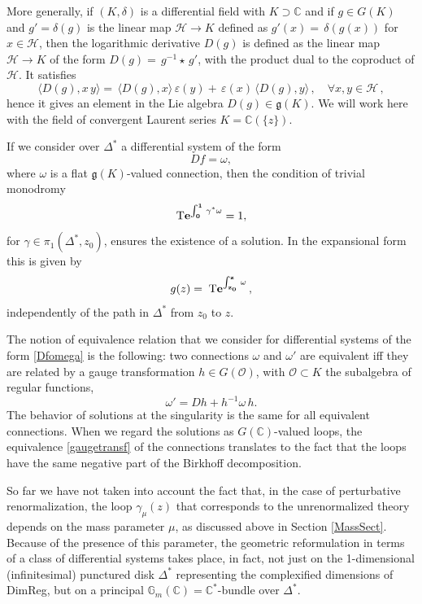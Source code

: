 \documentclass[10pt]{amsart}
\def\C{{\mathbb C}}
\newcommand{\bG}{\mathbb{G}}
\def\cH{{\mathcal H}}
\def\Hc{{\mathcal H}}
\renewcommand{\O}{{\mathcal O}}
\newcommand{\fg}{{\mathfrak{g}}}
\def\g{\gamma}
\def\ve{\varepsilon}
\def\qq{{\,,\quad \forall}}
\numberwithin{equation}{section}
\begin{document}
\smallskip

More generally, if $(K,\delta)$ is a differential field with $K\supset
\C$ and if $g\in
G(K)$ and $g'=\delta(g)$ is the linear map $\Hc\to K$ defined as
$g'(x)=\, \delta(g(x))$ for $x\in \Hc$, then the
logarithmic derivative $D(g)$ is defined as the linear map $\Hc\to K$
of the form $D(g)=\,g^{-1}\star\, g'$, with the product dual to the
coproduct of $\cH$. It satisfies
$$
\langle D(g),x\,y\rangle=\,\langle D(g),x\rangle\,\ve(y)
+\,\ve(x)\,\langle D(g),y\rangle \qq x,y \in \Hc\,,
$$
hence it gives an element in the Lie algebra $D(g) \in \fg(K)$. We
will work here with the field of convergent Laurent series $K=\C(\{z
\})$.

\smallskip

If we consider over $\Delta^*$ a differential system of the form
\begin{equation}\label{Dfomega}
Df =\omega,
\end{equation}
where $\omega$ is a flat $\fg(K)$-valued connection, then the condition of
trivial monodromy
\begin{equation}\label{mono}
{\bf {\rm T}e^{\int_0^1\,\g^*\omega}} =1,
\end{equation}
for $\gamma\in \pi_1(\Delta^*,z_0)$, ensures the existence of a
solution. In the expansional form this is given by
\begin{equation}\label{solution}
g(z) =\;{\bf {\rm T}e^{\int_{z_0}^z\,\omega}}\,,
 \end{equation}
independently of the path in $\Delta^*$ from $z_0$ to $z$.

\smallskip

The notion of equivalence relation that we consider for differential
systems of the form \eqref{Dfomega} is the following:
two connections $\omega$ and $\omega'$ are equivalent
iff they are related by a gauge transformation $h \in  G(\O)$, with $\O
\subset  {K}$ the subalgebra of regular functions,
\begin{equation}\label{gaugetransf}
 \omega' = Dh + h^{-1} \omega\, h.
\end{equation}
The behavior of solutions at the singularity is the same for all
equivalent connections. When we regard the solutions as $G(\C)$-valued
loops, the equivalence \eqref{gaugetransf} of the connections
translates to the fact that the loops have the same negative part of
the Birkhoff decomposition.

\smallskip

So far we have not taken into account the fact that, in the case of
perturbative renormalization, the loop $\gamma_\mu(z)$ that corresponds to the
unrenormalized theory depends on
the mass parameter $\mu$, as discussed above in Section
\ref{MassSect}. Because of the presence of this parameter, the
geometric reformulation in terms of a class of differential systems
takes place, in fact, not just on the 1-dimensional (infinitesimal)
punctured disk $\Delta^*$ representing the complexified dimensions of
DimReg, but on a principal $\bG_m(\C)=\C^*$-bundle over $\Delta^*$.
\end{document}
